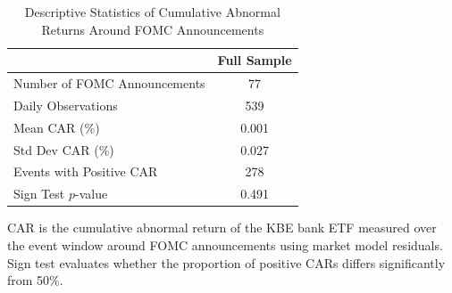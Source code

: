 \begin{table}[t]
\centering
\begin{threeparttable}
\caption{Descriptive Statistics of Cumulative Abnormal Returns Around FOMC Announcements}
\label{tab:desc_stats}
\begin{tabular}{lc}
\toprule
 & Full Sample \\
\midrule
Number of FOMC Announcements & 77 \\
Daily Observations & 539 \\
Mean CAR (\%) & 0.001 \\
Std Dev CAR (\%) & 0.027 \\
Events with Positive CAR & 278 \\
Sign Test $p$-value & 0.491 \\
\bottomrule
\end{tabular}
\begin{tablenotes}[flushleft]
\footnotesize
\item CAR is the cumulative abnormal return of the KBE bank ETF measured over the event window around FOMC announcements using market model residuals. Sign test evaluates whether the proportion of positive CARs differs significantly from 50\%.
\end{tablenotes}
\end{threeparttable}
\end{table}

